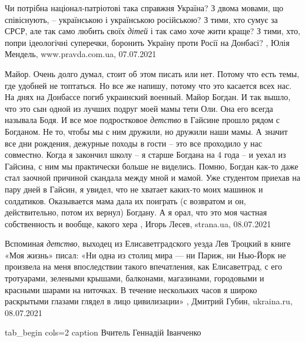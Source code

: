 Чи потрібна націонал-патріотові така справжня Україна? З двома мовами, що
співіснують, – українською і українською російською? З тими, хто сумує за СРСР,
але так само любить своїх \emph{дітей} і так само хоче жити краще?  З тими,
хто, попри ідеологічні суперечки, боронить Україну проти Росії на Донбасі?
, 
Юлія Мендель, www.pravda.com.ua, 07.07.2021

Майор.
Очень долго думал, стоит об этом писать или нет. Потому что есть темы, где
удобней не топтаться. Но все же напишу, потому что это касается всех нас.
На днях на Донбассе погиб украинский военный. Майор Богдан. И так вышло, что
это сын одной из лучших подруг моей мамы тети Оли. Она его всегда называла
Бодя. И все мое подростковое \emph{детство} в Гайсине прошло рядом с Богданом. Не то,
чтобы мы с ним дружили, но дружили наши мамы. А значит все дни рождения,
дежурные походы в гости – это все проходило у нас совместно.
Когда я закончил школу – я старше Богдана на 4 года – и уехал из Гайсина, с ним
мы практически больше не виделись. Помню, Богдан как-то даже стал заочной
причиной скандала между мной и мамой. Уже студентом приехав на пару дней в
Гайсин, я увидел, что не хватает каких-то моих машинок и солдатиков.
Оказывается мама дала их поиграть (с возвратом и он, действительно, потом их
вернул) Богдану. А я орал, что это моя частная собственность и вообще, какого
хера
, 
Игорь Лесев, strana.ua, 08.07.2021

Вспоминая \emph{детство}, выходец из Елисаветградского уезда Лев Троцкий в
книге «Моя жизнь» писал: «Ни одна из столиц мира — ни Париж, ни Нью-Йорк не
произвела на меня впоследствии такого впечатления, как Елисаветград, с его
тротуарами, зелеными крышами, балконами, магазинами, городовыми и красными
шарами на ниточках. В течение нескольких часов я широко раскрытыми глазами
глядел в лицо цивилизации»
, Дмитрий Губин, ukraina.ru, 08.07.2021


\ifcmt
  tab_begin cols=2
		 caption Вчитель Геннадій Іванченко

